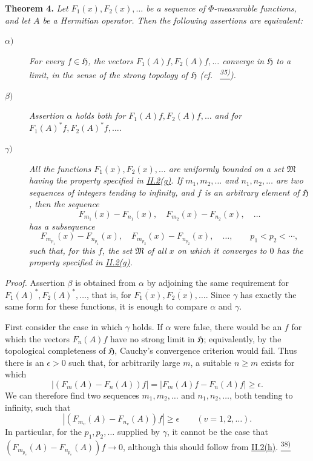 \documentclass[12pt,b5paper,twoside]{article}
\newcommand{\noteref}[1]{%
  \hyperlink{note:#1}{\textsuperscript{#1)}}}
\begin{document}
\medskip
{}\label{thm:4}\noindent\textbf{Theorem 4.}
\emph{Let \(F_1(x),F_2(x),\ldots\) be a sequence of
\(\Phi\)-measurable functions, and let \(A\) be a Hermitian operator.
Then the following assertions are equivalent:}
\begin{description}
 \item[\(\alpha)\)] \label{thm:4.alpha}\emph{For every \(f\in\mathfrak H\), the vectors
 \(F_1(A)f,F_2(A)f,\ldots\) converge in \(\mathfrak H\) to a limit, in
 the sense of the strong topology of \(\mathfrak H\)
 (cf.\ \noteref{35}).}

 \item[\(\beta)\)] \label{thm:4.beta}\emph{Assertion
 \hyperref[thm:4.alpha]{\(\alpha\)} holds both for
 \(F_1(A)f,F_2(A)f,\ldots\) and for
 \(F_1(A)^*f,F_2(A)^*f,\ldots\).}
 \item[\(\gamma)\)] \label{thm:4.gamma}\emph{All the functions
 \(F_1(x),F_2(x),\ldots\) are uniformly bounded on a set
 \(\mathfrak M\) having the property specified in
 \hyperref[prop:II.2.g]{II.2(g)}.  If \(m_1,m_2,\ldots\) and
 \(n_1,n_2,\ldots\) are two sequences of integers tending to infinity,
 and \(f\) is an arbitrary element of \(\mathfrak H\), then the sequence
 \[
  F_{m_1}(x)-F_{n_1}(x),\quad
  F_{m_2}(x)-F_{n_2}(x),\quad\ldots
 \]
 has a subsequence
 \[
  F_{m_{p_1}}(x)-F_{n_{p_1}}(x),\quad
  F_{m_{p_2}}(x)-F_{n_{p_2}}(x),\quad\ldots,
  \qquad p_1<p_2<\cdots,
 \]
 such that, for this \(f\), the set \(\mathfrak M\) of all \(x\) on
 which it converges to \(0\) has the property specified in
 \hyperref[prop:II.2.g]{II.2(g)}.}
\end{description}

\noindent\textit{Proof.}
Assertion \hyperref[thm:4.beta]{\(\beta\)} is obtained from
\hyperref[thm:4.alpha]{\(\alpha\)} by adjoining the same
requirement for \(F_1(A)^*,F_2(A)^*,\ldots\), that is, for
\(\overline{F_1(x)},\overline{F_2(x)},\ldots\).  Since
\hyperref[thm:4.gamma]{\(\gamma\)} has
exactly the same form for these functions, it is enough to compare
\hyperref[thm:4.alpha]{\(\alpha\)} and
\hyperref[thm:4.gamma]{\(\gamma\)}.

First consider the case in which \hyperref[thm:4.gamma]{\(\gamma\)}
holds.  If \hyperref[thm:4.alpha]{\(\alpha\)} were
false, there would be an \(f\) for which the vectors \(F_n(A)f\) have no
strong limit in \(\mathfrak H\); equivalently, by the topological
completeness of \(\mathfrak H\), Cauchy's convergence criterion would
fail.  Thus there is an \(\epsilon>0\) such that, for arbitrarily large
\(m\), a suitable \(n\geq m\) exists for which
\[
 |(F_m(A)-F_n(A))f|
 =|F_m(A)f-F_n(A)f|\geq\epsilon.
\]
We can therefore find two sequences \(m_1,m_2,\ldots\) and
\(n_1,n_2,\ldots\), both tending to infinity, such that
\[
 |(F_{m_v}(A)-F_{n_v}(A))f|\geq\epsilon
 \qquad(v=1,2,\ldots).
\]
In particular, for the \(p_1,p_2,\ldots\) supplied by
\hyperref[thm:4.gamma]{\(\gamma\)}, it
cannot be the case that
\((F_{m_{p_v}}(A)-F_{n_{p_v}}(A))f\to0\), although this should follow
from \hyperref[prop:II.2.h]{II.2(h)}.\noteref{38}
\end{document}
